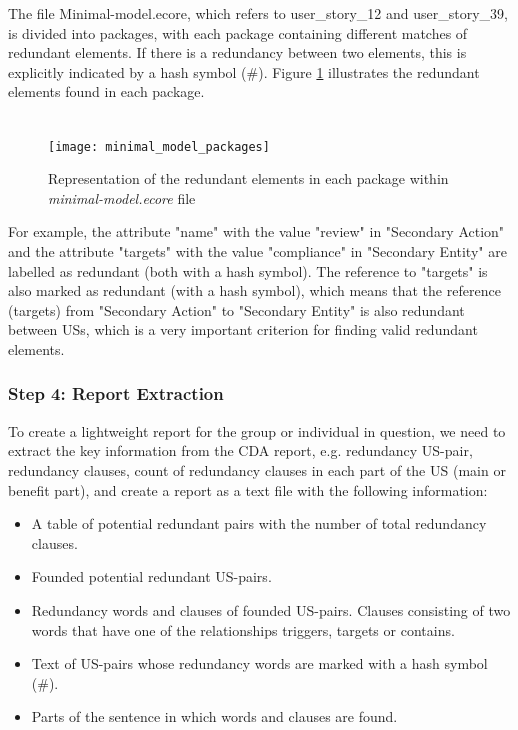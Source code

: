 \begin{example}
	The file Minimal-model.ecore, which refers to user\_story\_12 and user\_story\_39, is divided into packages, with each package containing different matches of redundant elements. If there is a redundancy between two elements, this is explicitly indicated by a hash symbol (\#). Figure \ref{fig:step3_cda_package} illustrates the redundant elements found in each package.\\\\
	\begin{figure}[h]
		\centering
		\texttt{[image: minimal\_model\_packages]}
		\caption{Representation of the redundant elements in each package within \textit{minimal-model.ecore} file}\label{fig:step3_cda_package}
	\end{figure}
	For example, the attribute "name" with the value "review" in "Secondary Action" and the attribute "targets" with the value "compliance" in "Secondary Entity" are labelled as redundant (both with a hash symbol). The reference to "targets" is also marked as redundant (with a hash symbol), which means that the reference (targets) from "Secondary Action" to "Secondary Entity" is also redundant between USs, which is a very important criterion for finding valid redundant elements.
\end{example}
\subsubsection*{Step 4: Report Extraction}\label{step_4}
To create a lightweight report for the group or individual in question, we need to extract the key information from the CDA report, e.g. redundancy US-pair, redundancy clauses, count of redundancy clauses in each part of the US (main or benefit part), and create a report as a text file with the following information:
\begin{itemize}
	
	\item A table of potential redundant pairs with the number of total redundancy clauses.
	
	\item Founded potential redundant US-pairs.
	
	\item Redundancy words and clauses of founded US-pairs. Clauses consisting of two words that have one of the relationships triggers, targets or contains.
	
	\item Text of US-pairs whose redundancy words are marked with a hash symbol (\#).
	
	\item Parts of the sentence in which words and clauses are found.
\end{itemize}
